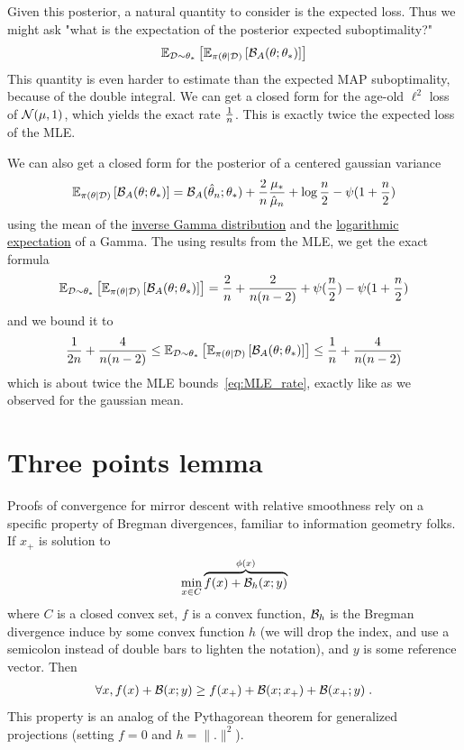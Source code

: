 \documentclass{article}
\newcommand*{\expect}[2][]{\ensuremath{\mathbb{E}_{#1} \left[ #2 \right] }} %
\newcommand{\logpart}{A}
\newcommand{\bregman}{\cB_\logpart}
\newcommand{\natp}{\theta}
\begin{document}
Given this posterior, a natural quantity to consider is the expected loss. Thus we might ask "what is the expectation of the posterior expected suboptimality?"
\begin{align}
    \expect[\cD\sim\natp_*]{\expect[\pi(\natp|\cD)]{\bregman(\natp ; \natp_*)}}
\end{align}
This quantity is even harder to estimate than the expected MAP suboptimality, because of the double integral. We can get a closed form for the age-old $\ell^2$ loss of ${\mathcal N}(\mu, 1)$, which yields the exact rate $\frac{1}{n}$. This is exactly twice the expected loss of the MLE.

\begin{example}
	We can also get a closed form for the posterior of a centered gaussian variance 
	\begin{align}
		\expect[\pi(\natp|\cD)]{\bregman(\natp ; \natp_*)} = \bregman(\hat \natp_n ; \natp_*) + \frac{2}{n} \frac{\mu_*}{\hat \mu_n} + \log\frac{n}{2} - \psi(1 + \frac{n}{2})
	\end{align}
	using the mean of the \href{https://en.wikipedia.org/wiki/Inverse-gamma_distribution}{inverse Gamma distribution} and the \href{https://en.wikipedia.org/wiki/Gamma_distribution#Logarithmic_expectation_and_variance}{logarithmic expectation} of a Gamma. The using results from the MLE, we get the exact formula
	\begin{align}
		\expect[\cD\sim\natp_*]{\expect[\pi(\natp|\cD)]{\bregman(\natp ; \natp_*)}}
		= \frac{2}{n} + \frac{2}{n(n-2)} + \psi(\half[n]) - \psi(1+ \half[n])
	\end{align}
	and we bound it to 
	\begin{align}
		\inv{2n} + \frac{4}{n(n-2)}
		\leq \expect[\cD\sim\natp_*]{\expect[\pi(\natp|\cD)]{\bregman(\natp ; \natp_*)}}
		\leq 
		\inv{n} + \frac{4}{n(n-2)}
	\end{align}
	which is about twice the MLE bounds~\eqref{eq:MLE_rate}, exactly like as we observed for the gaussian mean.
\end{example}


\section{Three points lemma}
\label{app:3points}

Proofs of convergence for mirror descent with relative smoothness rely on a specific property of Bregman divergences, familiar to information geometry folks. If $x_+$ is solution to 
\begin{align}
	\min	_{x\in C} \overbrace{f(x) + {\mathcal B}_h(x ; y)}^{\phi(x)}
\end{align}
where $C$ is a closed convex set, $f$ is a convex function, ${\mathcal B}_h$ is the Bregman divergence induce by some convex function $h$ (we will drop the index, and use a semicolon instead of double bars to lighten the notation), and $y$ is some reference vector. Then 
\begin{align}
	\forall x, f(x) + {\mathcal B}(x ;y) \geq f(x_+) + {\mathcal B}(x ; x_+) +{\mathcal B}(x_+ ; y) \; .
\end{align}
This property is an analog of the Pythagorean theorem for generalized projections (setting $f=0$ and $h=\|.\|^2$).
\end{document}
